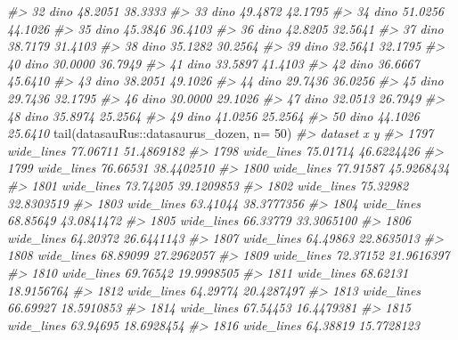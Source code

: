 \documentclass[
]{book}
\newenvironment{Shaded}{\begin{snugshade}}{\end{snugshade}}
\newcommand{\AttributeTok}[1]{\textcolor[rgb]{0.77,0.63,0.00}{#1}}
\newcommand{\CommentTok}[1]{\textcolor[rgb]{0.56,0.35,0.01}{\textit{#1}}}
\newcommand{\DecValTok}[1]{\textcolor[rgb]{0.00,0.00,0.81}{#1}}
\newcommand{\FunctionTok}[1]{\textcolor[rgb]{0.00,0.00,0.00}{#1}}
\newcommand{\NormalTok}[1]{#1}
\newcommand{\SpecialCharTok}[1]{\textcolor[rgb]{0.00,0.00,0.00}{#1}}
\theoremstyle{definition}
\theoremstyle{definition}
\theoremstyle{definition}
\theoremstyle{definition}
\theoremstyle{remark}
\begin{document}
\begin{Shaded}
\begin{Highlighting}[]
\CommentTok{\#\textgreater{} 32    dino 48.2051 38.3333}
\CommentTok{\#\textgreater{} 33    dino 49.4872 42.1795}
\CommentTok{\#\textgreater{} 34    dino 51.0256 44.1026}
\CommentTok{\#\textgreater{} 35    dino 45.3846 36.4103}
\CommentTok{\#\textgreater{} 36    dino 42.8205 32.5641}
\CommentTok{\#\textgreater{} 37    dino 38.7179 31.4103}
\CommentTok{\#\textgreater{} 38    dino 35.1282 30.2564}
\CommentTok{\#\textgreater{} 39    dino 32.5641 32.1795}
\CommentTok{\#\textgreater{} 40    dino 30.0000 36.7949}
\CommentTok{\#\textgreater{} 41    dino 33.5897 41.4103}
\CommentTok{\#\textgreater{} 42    dino 36.6667 45.6410}
\CommentTok{\#\textgreater{} 43    dino 38.2051 49.1026}
\CommentTok{\#\textgreater{} 44    dino 29.7436 36.0256}
\CommentTok{\#\textgreater{} 45    dino 29.7436 32.1795}
\CommentTok{\#\textgreater{} 46    dino 30.0000 29.1026}
\CommentTok{\#\textgreater{} 47    dino 32.0513 26.7949}
\CommentTok{\#\textgreater{} 48    dino 35.8974 25.2564}
\CommentTok{\#\textgreater{} 49    dino 41.0256 25.2564}
\CommentTok{\#\textgreater{} 50    dino 44.1026 25.6410}
\FunctionTok{tail}\NormalTok{(datasauRus}\SpecialCharTok{::}\NormalTok{datasaurus\_dozen, }\AttributeTok{n=} \DecValTok{50}\NormalTok{)}
\CommentTok{\#\textgreater{}         dataset        x          y}
\CommentTok{\#\textgreater{} 1797 wide\_lines 77.06711 51.4869182}
\CommentTok{\#\textgreater{} 1798 wide\_lines 75.01714 46.6224426}
\CommentTok{\#\textgreater{} 1799 wide\_lines 76.66531 38.4402510}
\CommentTok{\#\textgreater{} 1800 wide\_lines 77.91587 45.9268434}
\CommentTok{\#\textgreater{} 1801 wide\_lines 73.74205 39.1209853}
\CommentTok{\#\textgreater{} 1802 wide\_lines 75.32982 32.8303519}
\CommentTok{\#\textgreater{} 1803 wide\_lines 63.41044 38.3777356}
\CommentTok{\#\textgreater{} 1804 wide\_lines 68.85649 43.0841472}
\CommentTok{\#\textgreater{} 1805 wide\_lines 66.33779 33.3065100}
\CommentTok{\#\textgreater{} 1806 wide\_lines 64.20372 26.6441143}
\CommentTok{\#\textgreater{} 1807 wide\_lines 64.49863 22.8635013}
\CommentTok{\#\textgreater{} 1808 wide\_lines 68.89099 27.2962057}
\CommentTok{\#\textgreater{} 1809 wide\_lines 72.37152 21.9616397}
\CommentTok{\#\textgreater{} 1810 wide\_lines 69.76542 19.9998505}
\CommentTok{\#\textgreater{} 1811 wide\_lines 68.62131 18.9156764}
\CommentTok{\#\textgreater{} 1812 wide\_lines 64.29774 20.4287497}
\CommentTok{\#\textgreater{} 1813 wide\_lines 66.69927 18.5910853}
\CommentTok{\#\textgreater{} 1814 wide\_lines 67.54453 16.4479381}
\CommentTok{\#\textgreater{} 1815 wide\_lines 63.94695 18.6928454}
\CommentTok{\#\textgreater{} 1816 wide\_lines 64.38819 15.7728123}

\end{Highlighting}
\end{Shaded}
\end{document}

